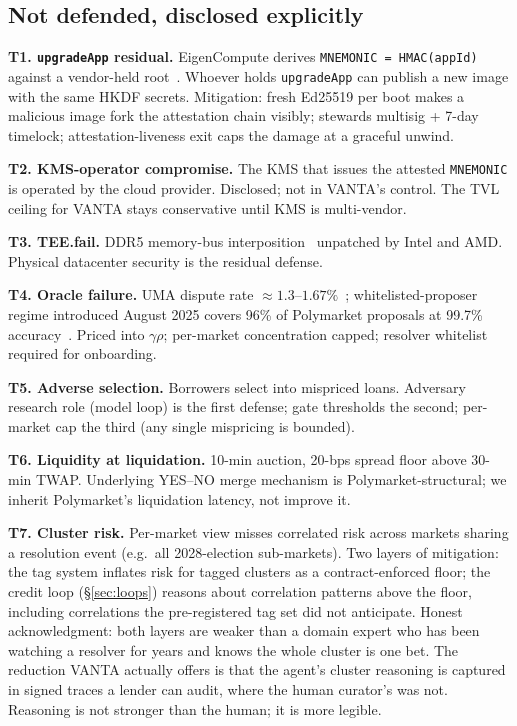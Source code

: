 \documentclass[11pt,letterpaper]{article}
\begin{document}
\subsection{Not defended, disclosed explicitly}

\textbf{T1. \texttt{upgradeApp} residual.} EigenCompute derives \texttt{MNEMONIC = HMAC(appId)} against a vendor-held root~\cite{eigencompute-arch}. Whoever holds \texttt{upgradeApp} can publish a new image with the same HKDF secrets. Mitigation: fresh Ed25519 per boot makes a malicious image fork the attestation chain visibly; stewards multisig + 7-day timelock; attestation-liveness exit caps the damage at a graceful unwind.

\textbf{T2. KMS-operator compromise.} The KMS that issues the attested \texttt{MNEMONIC} is operated by the cloud provider. Disclosed; not in VANTA's control. The TVL ceiling for VANTA stays conservative until KMS is multi-vendor.

\textbf{T3. TEE.fail.} DDR5 memory-bus interposition~\cite{teefail} unpatched by Intel and AMD. Physical datacenter security is the residual defense.

\textbf{T4. Oracle failure.} UMA dispute rate $\approx 1.3$--$1.67\%$~\cite{uma-disputes}; whitelisted-proposer regime introduced August 2025 covers 96\% of Polymarket proposals at 99.7\% accuracy~\cite{uma-managed}. Priced into $\gamma\rho$; per-market concentration capped; resolver whitelist required for onboarding.

\textbf{T5. Adverse selection.} Borrowers select into mispriced loans. Adversary research role (model loop) is the first defense; gate thresholds the second; per-market cap the third (any single mispricing is bounded).

\textbf{T6. Liquidity at liquidation.} 10-min auction, 20-bps spread floor above 30-min TWAP. Underlying YES--NO merge mechanism is Polymarket-structural; we inherit Polymarket's liquidation latency, not improve it.

\textbf{T7. Cluster risk.} Per-market view misses correlated risk across markets sharing a resolution event (e.g.\ all 2028-election sub-markets). Two layers of mitigation: the tag system inflates risk for tagged clusters as a contract-enforced floor; the credit loop (\S\ref{sec:loops}) reasons about correlation patterns above the floor, including correlations the pre-registered tag set did not anticipate. Honest acknowledgment: both layers are weaker than a domain expert who has been watching a resolver for years and knows the whole cluster is one bet. The reduction VANTA actually offers is that the agent's cluster reasoning is captured in signed traces a lender can audit, where the human curator's was not. Reasoning is not stronger than the human; it is more legible.
\end{document}
